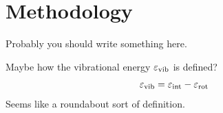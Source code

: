 \graphicspath{{./methodology/}}

\chapter{Methodology}
\label{sec:Methodology}

Probably you should write something here.

Maybe how the vibrational energy $\varepsilon_\mathrm{vib}$ is defined?
%
\begin{align}
   \varepsilon_\mathrm{vib} &= \varepsilon_\mathrm{int} - \varepsilon_\mathrm{rot}
   \label{eqn:ev}
\end{align}
%
Seems like a roundabout sort of definition.
